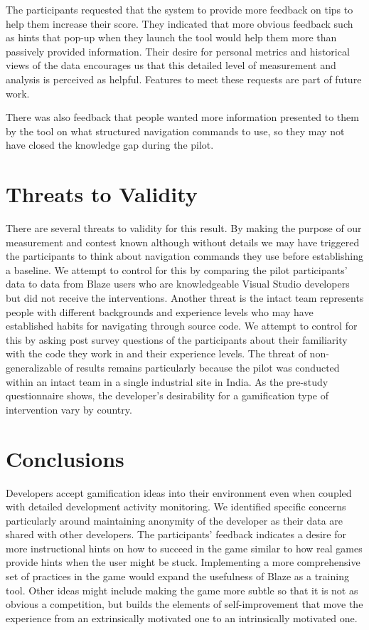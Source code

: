 \documentclass{sig-alternate}
\begin{document}
The participants requested that the system to provide more feedback on tips to help them increase their score. They indicated that more obvious feedback such as hints that pop-up when they launch the tool would help them more than passively provided information.  Their desire for personal metrics and historical views of the data encourages us that this detailed level of measurement and analysis is perceived as helpful.  Features to meet these requests are part of future work.    

There was also feedback that people wanted more information presented to them by the tool on what structured navigation commands to use, so they may not have closed the knowledge gap during the pilot.  

\section{Threats to Validity}
There are several threats to validity for this result.  By making the purpose of our measurement and contest known although without details we may have triggered the participants to think about navigation commands they use before establishing a baseline.  We attempt to control for this by comparing the pilot participants' data to data from Blaze users who are knowledgeable Visual Studio developers but did not receive the interventions.  Another threat is the intact team represents people with different backgrounds and experience levels who may have established habits for navigating through source code.  We attempt to control for this by asking post survey questions of the participants about their familiarity with the code they work in and their experience levels.  The threat of non- generalizable of results remains particularly because the pilot was conducted within an intact team in a single industrial site in India. As the pre-study questionnaire shows, the developer's desirability for a gamification type of intervention vary by country.

\section{Conclusions}
Developers accept gamification ideas into their environment even when coupled with detailed development activity monitoring.   We identified specific concerns particularly around maintaining anonymity of the developer as their data are shared with other developers.  The participants' feedback indicates a desire for more instructional hints on how to succeed in the game similar to how real games provide hints when the user might be stuck.  Implementing a more comprehensive set of practices in the game would expand the usefulness of Blaze as a training tool.  Other ideas might include making the game more subtle so that it is not as obvious a competition, but builds the elements of self-improvement that move the experience from an extrinsically motivated one to an intrinsically motivated one.  
\end{document}
